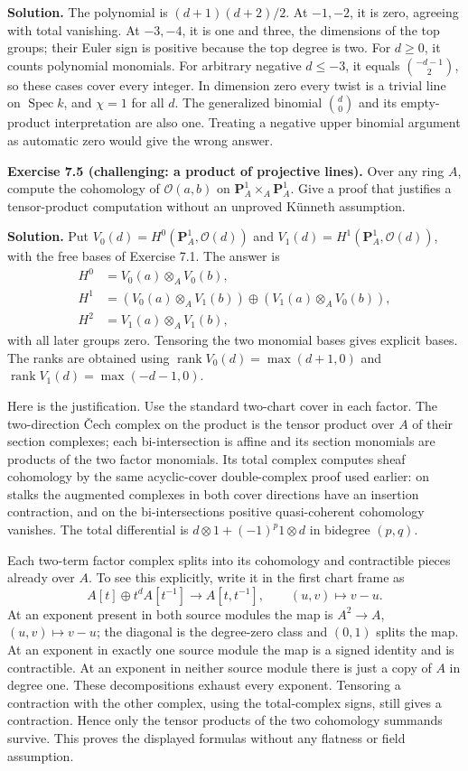 \documentclass[11pt]{article}
\begin{document}
\textbf{Solution.} The polynomial is \((d+1)(d+2)/2\). At \(-1,-2\), it
is zero, agreeing with total vanishing. At \(-3,-4\), it is one and
three, the dimensions of the top groups; their Euler sign is positive
because the top degree is two. For \(d\ge0\), it counts polynomial
monomials. For arbitrary negative \(d\le-3\), it equals
\(\binom{-d-1}{2}\), so these cases cover every integer. In dimension
zero every twist is a trivial line on \(\operatorname{Spec}k\), and
\(\chi=1\) for all \(d\). The generalized binomial \(\binom d0\) and its
empty-product interpretation are also one. Treating a negative upper
binomial argument as automatic zero would give the wrong answer.

\textbf{Exercise 7.5 (challenging: a product of projective lines).} Over
any ring \(A\), compute the cohomology of \(\mathcal O(a,b)\) on
\(\mathbf P_A^1\times_A\mathbf P_A^1\). Give a proof that justifies a
tensor-product computation without an unproved Künneth assumption.

\textbf{Solution.} Put \(V_0(d)=H^0(\mathbf P_A^1,\mathcal O(d))\) and
\(V_1(d)=H^1(\mathbf P_A^1,\mathcal O(d))\), with the free bases of
Exercise 7.1. The answer is \[
\begin{aligned}
H^0&=V_0(a)\otimes_A V_0(b),\\
H^1&=(V_0(a)\otimes_A V_1(b))\oplus(V_1(a)\otimes_A V_0(b)),\\
H^2&=V_1(a)\otimes_A V_1(b),
\end{aligned}
\] with all later groups zero. Tensoring the two monomial bases gives
explicit bases. The ranks are obtained using
\(\operatorname{rank}V_0(d)=\max(d+1,0)\) and
\(\operatorname{rank}V_1(d)=\max(-d-1,0)\).

Here is the justification. Use the standard two-chart cover in each
factor. The two-direction Čech complex on the product is the tensor
product over \(A\) of their section complexes; each bi-intersection is
affine and its section monomials are products of the two factor
monomials. Its total complex computes sheaf cohomology by the same
acyclic-cover double-complex proof used earlier: on stalks the augmented
complexes in both cover directions have an insertion contraction, and on
the bi-intersections positive quasi-coherent cohomology vanishes. The
total differential is \(d\otimes1+(-1)^p1\otimes d\) in bidegree
\((p,q)\).

Each two-term factor complex splits into its cohomology and contractible
pieces already over \(A\). To see this explicitly, write it in the first
chart frame as \[
A[t]\oplus t^d A[t^{-1}]\longrightarrow A[t,t^{-1}],
\qquad(u,v)\longmapsto v-u.
\] At an exponent present in both source modules the map is
\(A^2\to A\), \((u,v)\mapsto v-u\); the diagonal is the degree-zero
class and \((0,1)\) splits the map. At an exponent in exactly one source
module the map is a signed identity and is contractible. At an exponent
in neither source module there is just a copy of \(A\) in degree one.
These decompositions exhaust every exponent. Tensoring a contraction
with the other complex, using the total-complex signs, still gives a
contraction. Hence only the tensor products of the two cohomology
summands survive. This proves the displayed formulas without any
flatness or field assumption.
\end{document}
